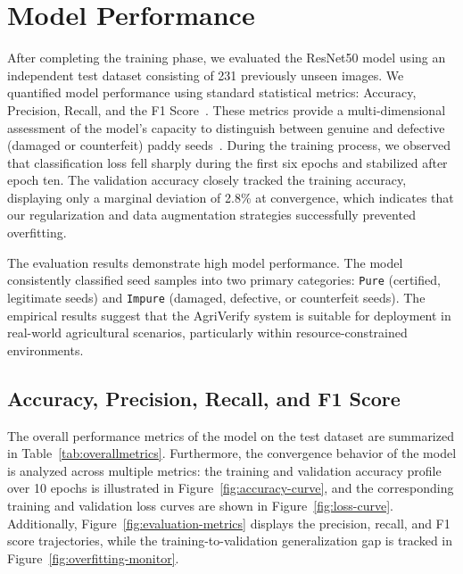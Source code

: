 
\section{Model Performance}

After completing the training phase, we evaluated the ResNet50 model using an independent test dataset consisting of 231 previously unseen images. We quantified model performance using standard statistical metrics: Accuracy, Precision, Recall, and the F1 Score~\cite{pedregosa2011sklearn}. These metrics provide a multi-dimensional assessment of the model's capacity to distinguish between genuine and defective (damaged or counterfeit) paddy seeds~\cite{he2016deep, xu2021}. During the training process, we observed that classification loss fell sharply during the first six epochs and stabilized after epoch ten. The validation accuracy closely tracked the training accuracy, displaying only a marginal deviation of 2.8\% at convergence, which indicates that our regularization and data augmentation strategies successfully prevented overfitting.

The evaluation results demonstrate high model performance. The model consistently classified seed samples into two primary categories: \texttt{Pure} (certified, legitimate seeds) and \texttt{Impure} (damaged, defective, or counterfeit seeds). The empirical results suggest that the AgriVerify system is suitable for deployment in real-world agricultural scenarios, particularly within resource-constrained environments.

\subsection{Accuracy, Precision, Recall, and F1 Score}

The overall performance metrics of the model on the test dataset are summarized in Table~\ref{tab:overallmetrics}. Furthermore, the convergence behavior of the model is analyzed across multiple metrics: the training and validation accuracy profile over 10 epochs is illustrated in Figure~\ref{fig:accuracy-curve}, and the corresponding training and validation loss curves are shown in Figure~\ref{fig:loss-curve}. Additionally, Figure~\ref{fig:evaluation-metrics} displays the precision, recall, and F1 score trajectories, while the training-to-validation generalization gap is tracked in Figure~\ref{fig:overfitting-monitor}.

